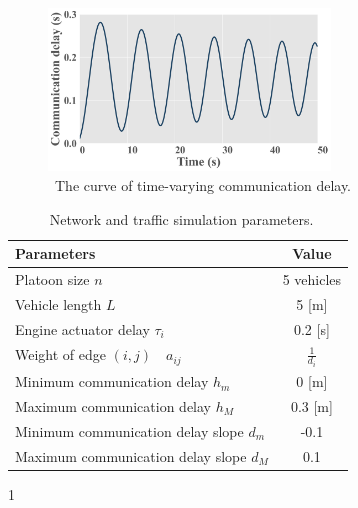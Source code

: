 \documentclass[journal]{IEEEtran}
\begin{document}
\begin{figure}
  \centering

  \includegraphics[width=7.5cm]{figs/fig2.png}
  \caption{~The curve of time-varying communication delay.}
  \label{fig2}
\end{figure}

\begin{table}
  \centering
  \setlength{\abovecaptionskip}{0pt}
  \setlength{\belowcaptionskip}{10pt}%
  \begin{threeparttable}[b]

    \caption{~Network and traffic simulation parameters.}
    \label{table1}
    {\begin{tabular}{lc} \toprule
        Parameters                                         & Value               \\ \midrule
        Platoon size $n$                                   & 5 vehicles          \\
        Vehicle length $L$                                 & 5 [m]               \\
        Engine actuator delay $\tau_i$                     & 0.2 [s] \tnote{1}   \\
        Weight of edge $\left( {i,j} \right) \quad a_{ij}$ & $\frac{1}{{{d_i}}}$ \\
        Minimum communication delay $h_{m}$                & 0 [m]               \\
        Maximum communication delay $h_{M}$                & 0.3 [m]             \\
        Minimum communication delay slope $d_{m}$          & -0.1                \\
        Maximum communication delay slope $d_{M}$          & 0.1                 \\
        \bottomrule
      \end{tabular}}
    \begin{tablenotes}
      \item[1] \citep{Wang2018a,Zhou2020}
    \end{tablenotes}
  \end{threeparttable}
\end{table}
\end{document}
